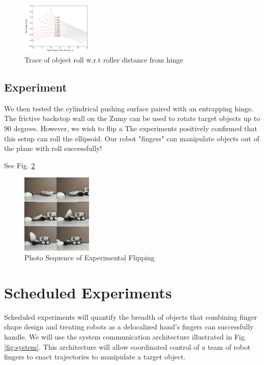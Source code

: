\documentclass[runningheads,a4paper]{llncs}
\begin{document}
\begin{figure}[h!]
\centering
\includegraphics[width=0.3\textwidth]{RollerFlipTrace.png}
\caption{\label{fig:roller}Trace of object roll w.r.t roller distance from hinge}
\end{figure}

\subsection{Experiment}
We then tested the cylindrical pushing surface paired with an entrapping hinge.
The frictive backstop wall on the Zumy can be used to rotate target objects up to 90 degrees.
However, we wish to flip a
The experiments positively confirmed that this setup can roll the ellipsoid.
Our robot "fingers" can manipulate objects out of the plane with roll successfully!

See Fig. \ref{fig:photos}

\begin{figure}[h!]
\centering
\includegraphics[width=0.3\textwidth]{Photo_Sequence.jpg}
\caption{\label{fig:photos}Photo Sequence of Experimental Flipping}
\end{figure}

\clearpage
\section{Scheduled Experiments}
Scheduled experiments will quantify the breadth of objects that combining finger shape design and treating robots as a delocalized hand's fingers can successfully handle.
We will use the system communication architecture illustrated in Fig. \ref{fig:system}.
This architecture will allow coordinated control of a team of robot fingers to enact trajectories to manipulate a target object.
\end{document}
